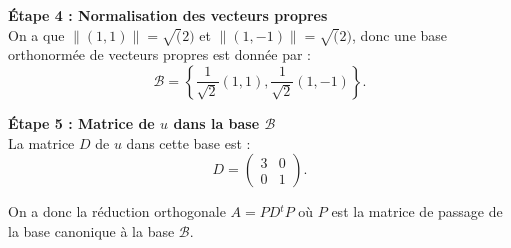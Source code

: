 \documentclass{article}
\begin{document}
{    \noindent\textbf{Étape 4 : Normalisation des vecteurs propres}\\
    On a que $\| (1,1) \| = \sqrt(2)$ et $\| (1,-1) \| = \sqrt(2)$, donc une base orthonormée de vecteurs propres est donnée par :
    \[
        \mathcal{B} = \left\{ \frac{1}{\sqrt{2}}(1,1), \frac{1}{\sqrt{2}}(1,-1) \right\}.
    \]

    \noindent\textbf{Étape 5 : Matrice de $u$ dans la base $\mathcal{B}$}\\
    La matrice $D$ de $u$ dans cette base est : 
    \[
        D = \begin{pmatrix}
            3 & 0 \\
            0 & 1
        \end{pmatrix}.
    \]

    \noindent On a donc la réduction orthogonale $A = PD { }^t P$ où $P$ est la matrice de passage de la base canonique à la base $\mathcal{B}$.
}
\newpage
\tableofcontents
\end{document}
